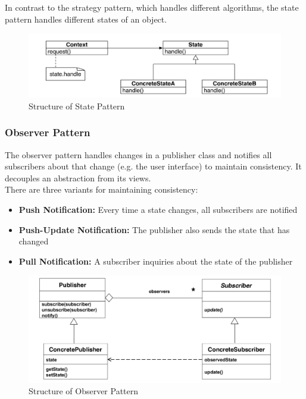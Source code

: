 In contrast to the strategy pattern, which handles different algorithms, the state pattern handles different states of an object.

\begin{figure}[h]
	\centering
	\includegraphics[width=\linewidth]{images/pattern_state.png}
	\caption{Structure of State Pattern}
\end{figure}
\newpage

\subsubsection{Observer Pattern}
The observer pattern handles changes in a publisher class and notifies all subscribers about that change (e.g. the user interface) to maintain consistency. It decouples an abstraction from its views.\\
There are three variants for maintaining consistency:
\begin{itemize}
  \item \textbf{Push Notification:} Every time a state changes, all subscribers are notified
  \item \textbf{Push-Update Notification:} The publisher also sends the state that has changed
  \item \textbf{Pull Notification:} A subscriber inquiries about the state of the publisher
\end{itemize}

\begin{figure}[h]
	\centering
	\includegraphics[width=\linewidth]{images/pattern_observer.png}
	\caption{Structure of Observer Pattern}
\end{figure}
\newpage

